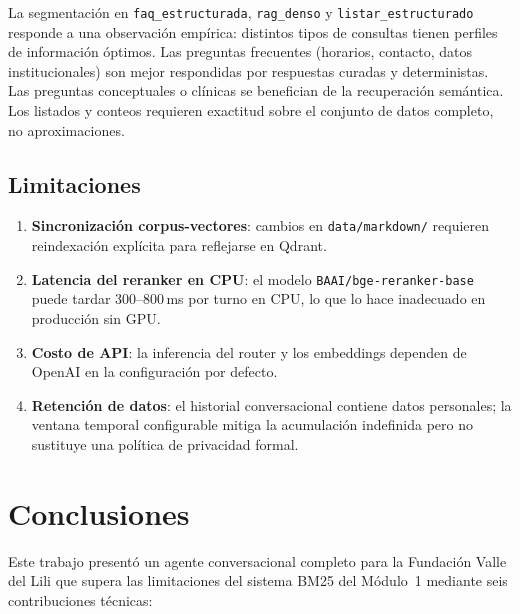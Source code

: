 \documentclass[conference]{IEEEtran}
\newcommand{\code}[1]{\texttt{\small #1}}
\begin{document}
La segmentación en \code{faq\_estructurada}, \code{rag\_denso} y
\code{listar\_estructurado} responde a una observación empírica: distintos
tipos de consultas tienen perfiles de información óptimos. Las preguntas
frecuentes (horarios, contacto, datos institucionales) son mejor respondidas
por respuestas curadas y deterministas. Las preguntas conceptuales o clínicas
se benefician de la recuperación semántica. Los listados y conteos requieren
exactitud sobre el conjunto de datos completo, no aproximaciones.

\subsection{Limitaciones}

\begin{enumerate}
    \item \textbf{Sincronización corpus-vectores}: cambios en
          \code{data/markdown/} requieren reindexación explícita para reflejarse
          en Qdrant.
    \item \textbf{Latencia del reranker en CPU}: el modelo
          \code{BAAI/bge-reranker-base} puede tardar 300--800\,ms por turno en
          CPU, lo que lo hace inadecuado en producción sin GPU.
    \item \textbf{Costo de API}: la inferencia del router y los embeddings
          dependen de OpenAI en la configuración por defecto.
    \item \textbf{Retención de datos}: el historial conversacional contiene
          datos personales; la ventana temporal configurable mitiga la
          acumulación indefinida pero no sustituye una política de privacidad
          formal.
\end{enumerate}

\section{Conclusiones}
\label{sec:conc}

Este trabajo presentó un agente conversacional completo para la Fundación
Valle del Lili que supera las limitaciones del sistema BM25 del Módulo~1
mediante seis contribuciones técnicas:
\end{document}
